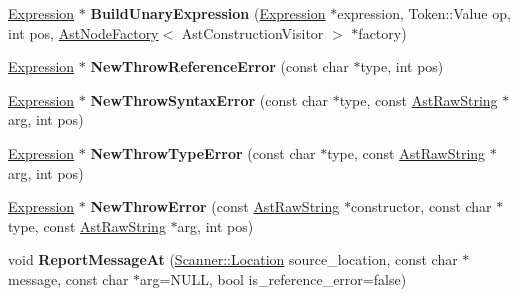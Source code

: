 \begin{DoxyCompactItemize}
\item 
\hypertarget{classv8_1_1internal_1_1_parser_traits_ab8438d035bd2abc24da42e858ae16b52}{}\hyperlink{classv8_1_1internal_1_1_expression}{Expression} $\ast$ {\bfseries Build\+Unary\+Expression} (\hyperlink{classv8_1_1internal_1_1_expression}{Expression} $\ast$expression, Token\+::\+Value op, int pos, \hyperlink{classv8_1_1internal_1_1_ast_node_factory}{Ast\+Node\+Factory}$<$ Ast\+Construction\+Visitor $>$ $\ast$factory)\label{classv8_1_1internal_1_1_parser_traits_ab8438d035bd2abc24da42e858ae16b52}

\item 
\hypertarget{classv8_1_1internal_1_1_parser_traits_a20ee26c18bc65b3d2bc04ca9357c3354}{}\hyperlink{classv8_1_1internal_1_1_expression}{Expression} $\ast$ {\bfseries New\+Throw\+Reference\+Error} (const char $\ast$type, int pos)\label{classv8_1_1internal_1_1_parser_traits_a20ee26c18bc65b3d2bc04ca9357c3354}

\item 
\hypertarget{classv8_1_1internal_1_1_parser_traits_a62312b6af70fce08722f7268a909edde}{}\hyperlink{classv8_1_1internal_1_1_expression}{Expression} $\ast$ {\bfseries New\+Throw\+Syntax\+Error} (const char $\ast$type, const \hyperlink{classv8_1_1internal_1_1_ast_raw_string}{Ast\+Raw\+String} $\ast$arg, int pos)\label{classv8_1_1internal_1_1_parser_traits_a62312b6af70fce08722f7268a909edde}

\item 
\hypertarget{classv8_1_1internal_1_1_parser_traits_a780d57aec30896ee53f2c32750bb40e5}{}\hyperlink{classv8_1_1internal_1_1_expression}{Expression} $\ast$ {\bfseries New\+Throw\+Type\+Error} (const char $\ast$type, const \hyperlink{classv8_1_1internal_1_1_ast_raw_string}{Ast\+Raw\+String} $\ast$arg, int pos)\label{classv8_1_1internal_1_1_parser_traits_a780d57aec30896ee53f2c32750bb40e5}

\item 
\hypertarget{classv8_1_1internal_1_1_parser_traits_a77bd5975c00050cf373c4fa9c6bf0c9c}{}\hyperlink{classv8_1_1internal_1_1_expression}{Expression} $\ast$ {\bfseries New\+Throw\+Error} (const \hyperlink{classv8_1_1internal_1_1_ast_raw_string}{Ast\+Raw\+String} $\ast$constructor, const char $\ast$type, const \hyperlink{classv8_1_1internal_1_1_ast_raw_string}{Ast\+Raw\+String} $\ast$arg, int pos)\label{classv8_1_1internal_1_1_parser_traits_a77bd5975c00050cf373c4fa9c6bf0c9c}

\item 
\hypertarget{classv8_1_1internal_1_1_parser_traits_a90151b3f6528940b6349945f94dc3c19}{}void {\bfseries Report\+Message\+At} (\hyperlink{structv8_1_1internal_1_1_scanner_1_1_location}{Scanner\+::\+Location} source\+\_\+location, const char $\ast$message, const char $\ast$arg=N\+U\+L\+L, bool is\+\_\+reference\+\_\+error=false)\label{classv8_1_1internal_1_1_parser_traits_a90151b3f6528940b6349945f94dc3c19}


\end{DoxyCompactItemize}
